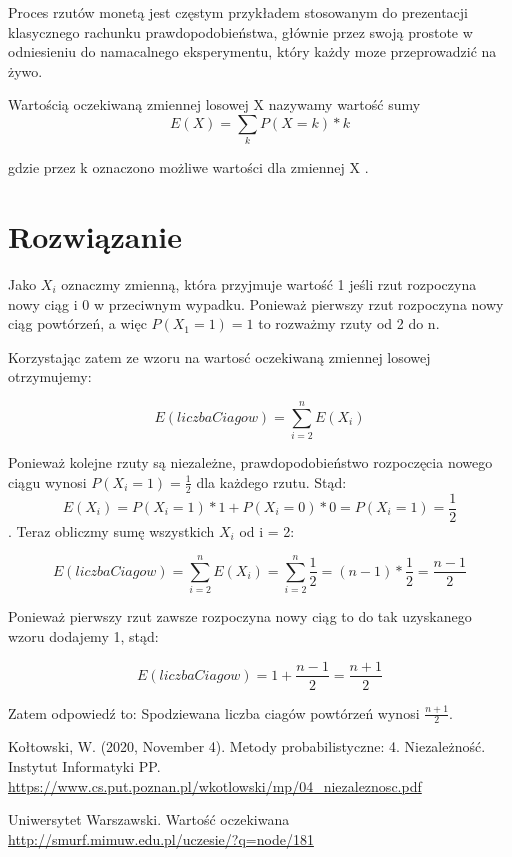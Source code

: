 \documentclass[12pt,oneside,a4paper]{book} %
\theoremstyle{break}
\begin{document}
Proces rzutów monetą jest częstym przykładem stosowanym do prezentacji klasycznego rachunku prawdopodobieństwa, głównie przez swoją prostote w odniesieniu do namacalnego eksperymentu, który każdy moze przeprowadzić na żywo.

Wartością oczekiwaną zmiennej losowej X nazywamy wartość sumy
\[
  E(X)=\sum_{k}P(X=k)*k
\]

gdzie przez k oznaczono możliwe wartości dla zmiennej X \cite{OczekiwanaMIMUW}.




\chapter*{Rozwiązanie}

Jako $X_i$ oznaczmy zmienną, która przyjmuje wartość 1 jeśli rzut rozpoczyna nowy ciąg i 0 w przeciwnym wypadku. Ponieważ pierwszy rzut rozpoczyna nowy ciąg powtórzeń, a więc $P(X_1=1)=1$ to rozważmy rzuty od 2 do n. 

Korzystając zatem ze wzoru na wartosć oczekiwaną zmiennej losowej otrzymujemy:

\[
  E(liczbaCiagow) = \sum_{i=2}^{n}E(X_i)
\]

Ponieważ kolejne rzuty są niezależne, prawdopodobieństwo rozpoczęcia nowego ciągu wynosi $P(X_i=1)=\frac{1}{2}$ dla każdego rzutu. Stąd: \[E(X_i)=P(X_i=1)*1+P(X_i=0)*0=P(X_i=1)=\frac{1}{2}\]. Teraz obliczmy sumę wszystkich $X_i$ od i = 2:

\[
  E(liczbaCiagow)=\sum_{i=2}^{n}E(X_i) = \sum_{i=2}^{n}\frac{1}{2} = (n-1)*\frac{1}{2} = \frac{n-1}{2}
\]

Ponieważ pierwszy rzut zawsze rozpoczyna nowy ciąg to do tak uzyskanego wzoru dodajemy 1, stąd:

\[
  E(liczbaCiagow) = 1 + \frac{n-1}{2} = \frac{n+1}{2}
\]

Zatem odpowiedź to: Spodziewana liczba ciagów powtórzeń wynosi $\frac{n+1}{2}$.

\begin{thebibliography}{00}
  Kołtowski, W. (2020, November 4). Metody probabilistyczne: 4. Niezależność. Instytut Informatyki PP.\\ \url{https://www.cs.put.poznan.pl/wkotlowski/mp/04\_niezaleznosc.pdf}

  Uniwersytet Warszawski. Wartość oczekiwana\\
  \url{http://smurf.mimuw.edu.pl/uczesie/?q=node/181}

\end{thebibliography}
\end{document}
